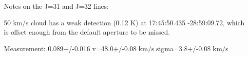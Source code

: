 Notes on the J=31 and J=32 lines:

50 km/s cloud has a weak detection (0.12 K) at 17:45:50.435 -28:59:09.72, which is offset enough from the default aperture to be missed.

Measurement: 0.089+/-0.016 v=48.0+/-0.08 km/s sigma=3.8+/-0.08 km/s
